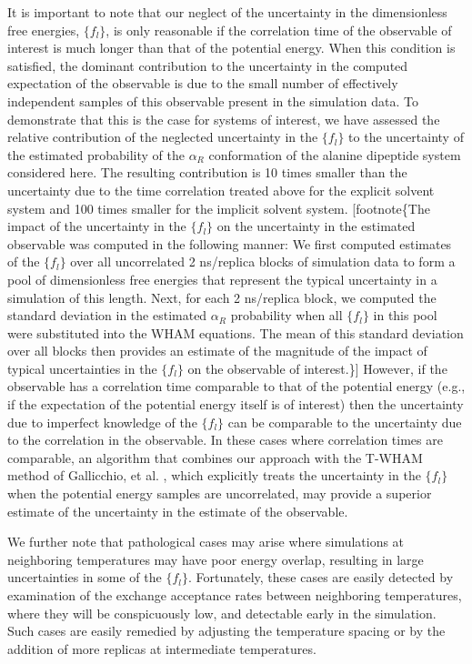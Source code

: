 It is important to note that our neglect of the uncertainty in the dimensionless free energies, $\{f_l\}$, is only reasonable if the correlation time of the observable of interest is much longer than that of the potential energy.  
When this condition is satisfied, the dominant contribution to the uncertainty in the computed expectation of the observable is due to the small number of effectively independent samples of this observable present in the simulation data.  
To demonstrate that this is the case for systems of interest, we have assessed the relative contribution of the neglected uncertainty in the $\{f_l\}$ to the uncertainty of the estimated probability of the $\alpha_R$ conformation of the alanine dipeptide system considered here.
The resulting contribution is 10 times smaller than the uncertainty due to the time correlation treated above for the explicit solvent system and 100 times smaller for the implicit solvent system.
[footnote\{The impact of the uncertainty in the $\{f_l\}$ on the uncertainty in the estimated observable was computed in the following manner: 
We first computed estimates of the $\{f_l\}$ over all uncorrelated 2 ns/replica blocks of simulation data to form a pool of dimensionless free energies that represent the typical uncertainty in a simulation of this length.
Next, for each 2 ns/replica block, we computed the standard deviation in the estimated $\alpha_R$ probability when all $\{f_l\}$ in this pool were substituted into the WHAM equations.
The mean of this standard deviation over all blocks then provides an estimate of the magnitude of the impact of typical uncertainties in the $\{f_l\}$ on the observable of interest.\}]
However, if the observable has a correlation time comparable to that of the potential energy (e.g., if the expectation of the potential energy itself is of interest) then the uncertainty due to imperfect knowledge of the $\{f_l\}$ can be comparable to the uncertainty due to the correlation in the observable.
In these cases where correlation times are comparable, an algorithm that combines our approach with the T-WHAM method of Gallicchio, et al. \cite{gallicchio:2005a}, which explicitly treats the uncertainty in the $\{f_l\}$ when the potential energy samples are uncorrelated, may provide a superior estimate of the uncertainty in the estimate of the observable.
 
We further note that pathological cases may arise where simulations at neighboring temperatures may have poor energy overlap, resulting in large uncertainties in some of the $\{f_l\}$.
Fortunately, these cases are easily detected by examination of the exchange acceptance rates between neighboring temperatures, where they will be conspicuously low, and detectable early in the simulation.  
Such cases are easily remedied by adjusting the temperature spacing or by the addition of more replicas at intermediate temperatures. 

